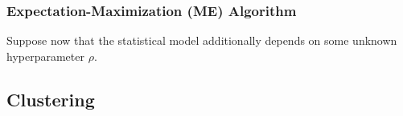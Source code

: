 \documentclass{article}
\begin{document}
\subsubsection*{Expectation-Maximization (ME) Algorithm}
Suppose now that the statistical model additionally depends on some unknown hyperparameter $\rho$. 
\subsection{Clustering}
\end{document}
